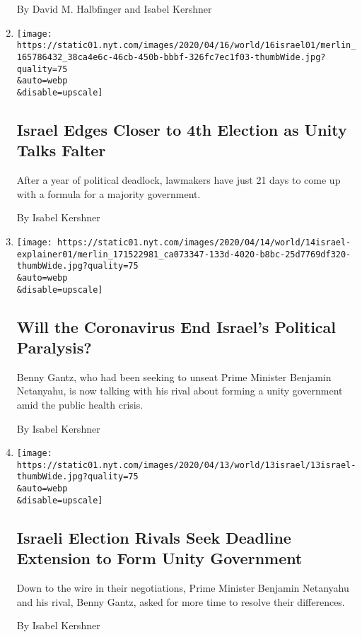 \begin{enumerate}
  By David M. Halbfinger and Isabel Kershner
\item
  \href{/2020/04/16/world/middleeast/israel-election-gantz-netanyahu.html}{}

  \texttt{[image: https://static01.nyt.com/images/2020/04/16/world/16israel01/merlin\_165786432\_38ca4e6c-46cb-450b-bbbf-326fc7ec1f03-thumbWide.jpg?quality=75\\\&auto=webp\\\&disable=upscale]}

  \hypertarget{israel-edges-closer-to-4th-election-as-unity-talks-falter}{%
  \subsection{Israel Edges Closer to 4th Election as Unity Talks
  Falter}\label{israel-edges-closer-to-4th-election-as-unity-talks-falter}}

  After a year of political deadlock, lawmakers have just 21 days to
  come up with a formula for a majority government.

  By Isabel Kershner
\item
  \href{/2020/04/14/world/middleeast/israel-coronavirus-netanyahu-gantz.html}{}

  \texttt{[image: https://static01.nyt.com/images/2020/04/14/world/14israel-explainer01/merlin\_171522981\_ca073347-133d-4020-b8bc-25d7769df320-thumbWide.jpg?quality=75\\\&auto=webp\\\&disable=upscale]}

  \hypertarget{will-the-coronavirus-end-israels-political-paralysis}{%
  \subsection{Will the Coronavirus End Israel's Political
  Paralysis?}\label{will-the-coronavirus-end-israels-political-paralysis}}

  Benny Gantz, who had been seeking to unseat Prime Minister Benjamin
  Netanyahu, is now talking with his rival about forming a unity
  government amid the public health crisis.

  By Isabel Kershner
\item
  \href{/2020/04/13/world/middleeast/israel-election-netanyahu-gantz.html}{}

  \texttt{[image: https://static01.nyt.com/images/2020/04/13/world/13israel/13israel-thumbWide.jpg?quality=75\\\&auto=webp\\\&disable=upscale]}

  \hypertarget{israeli-election-rivals-seek-deadline-extension-to-form-unity-government}{%
  \subsection{Israeli Election Rivals Seek Deadline Extension to Form
  Unity
  Government}\label{israeli-election-rivals-seek-deadline-extension-to-form-unity-government}}

  Down to the wire in their negotiations, Prime Minister Benjamin
  Netanyahu and his rival, Benny Gantz, asked for more time to resolve
  their differences.

  By Isabel Kershner
\end{enumerate}

